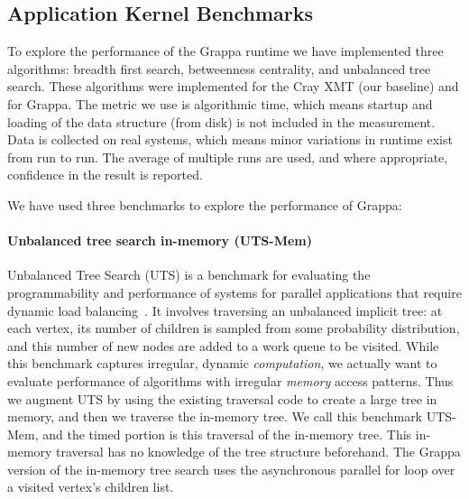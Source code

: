 \subsection{Application Kernel Benchmarks}

To explore the performance of the Grappa runtime we have implemented
three algorithms: breadth first search, betweenness centrality, and
unbalanced tree search.  These algorithms were implemented for the
Cray XMT (our baseline) and for Grappa.  The metric we use is
algorithmic time, which means startup and loading of the data
structure (from disk) is not included in the measurement.  Data is
collected on real systems, which means minor variations in runtime
exist from run to run.  The average of multiple runs are used, and
where appropriate, confidence in the result is reported.

We have used three benchmarks to explore the performance of Grappa:

\paragraph{Unbalanced tree search in-memory (UTS-Mem)} Unbalanced Tree
Search (UTS) is a benchmark for evaluating the programmability and
performance of systems for parallel applications that require dynamic
load balancing~\cite{UTS}. It involves traversing an
unbalanced implicit tree: at each vertex, its number of children is
sampled from some probability distribution, and this number of new nodes
are added to a work queue to be visited. While this benchmark captures
irregular, dynamic \emph{computation}, we actually want to evaluate
performance of algorithms with irregular \emph{memory} access patterns.
Thus we augment UTS by using the existing traversal code to create a
large tree in memory, and then we traverse the in-memory tree. We call
this benchmark UTS-Mem, and the timed portion is this traversal of the
in-memory tree. This in-memory traversal has no knowledge of the
tree structure beforehand.  The Grappa version of the in-memory tree
search uses the asynchronous parallel for loop over a visited vertex's
children list.

